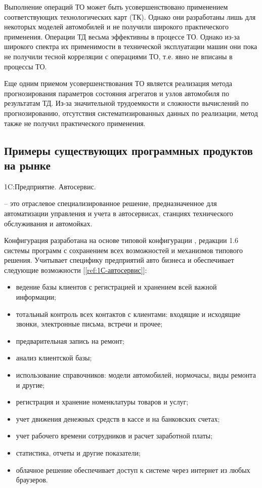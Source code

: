 Выполнение операций ТО может быть усовершенствовано применением соответствующих
технологических карт (ТК). Однако они разработаны лишь для некоторых моделей
автомобилей и не получили широкого практического применения.
Операции ТД весьма эффективны в процессе ТО. Однако из-за широкого спектра их
применимости в технической эксплуатации машин они пока не получили тесной
корреляции с операциями ТО, т.е. явно не вписаны в процессы ТО.

Еще одним приемом усовершенствования ТО является реализация метода
прогнозирования параметров состояния агрегатов и узлов автомобиля по результатам
ТД. Из-за значительной трудоемкости и сложности вычислений по прогнозированию,
отсутствия систематизированных данных по реализации, метод также не получил
практического применения.

\subsection{Примеры существующих программных продуктов на рынке}
1C:Предприятие. Автосервис.

 – это отраслевое специализированное решение, предназначенное
для автоматизации управления и учета в автосервисах, станциях технического
обслуживания и автомойках.

Конфигурация  разработана на основе типовой конфигурации
, редакции 1.6 системы программ
 с сохранением всех возможностей и механизмов
типового решения. Учитывает специфику предприятий авто бизнеса и обеспечивает
следующие возможности [\ref{ref:1С-автосервис}]:
\begin{itemize}
	\item ведение базы клиентов с регистрацией и хранением всей важной
		информации;
	\item тотальный контроль всех контактов с клиентами: входящие и
		исходящие звонки, электронные письма, встречи и прочее;
	\item предварительная запись на ремонт;
	\item анализ клиентской базы;
	\item использование справочников: модели автомобилей, нормочасы, виды
		ремонта и другие;
	\item регистрация и хранение номенклатуры товаров и услуг;
	\item учет движения денежных средств в кассе и на банковских счетах;
	\item учет рабочего времени сотрудников и расчет заработной платы;
	\item статистика, отчеты и другие показатели;
	\item облачное решение обеспечивает доступ к системе через интернет из любых
		браузеров.
	\\[\baselineskip]
\end{itemize}


